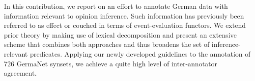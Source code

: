 In this contribution, we report on an effort to annotate German data with information relevant to opinion inference. Such information has previously been referred to as effect or couched in terms of event-evaluation functors. We extend                                                  prior theory by making use of lexical decomposition and present an extensive scheme that combines both approaches and thus broadens the set of inference-relevant predicates. Applying our newly developed guidelines to the annotation of 726 GermaNet synsets, we achieve a quite high level of inter-annotator agreement.
